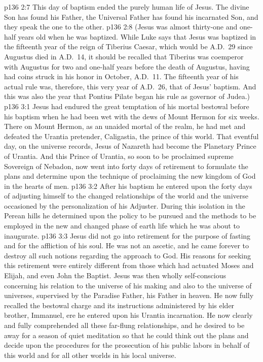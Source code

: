 \vs p136 2:7 This day of baptism ended the purely human life of Jesus. The divine Son has found his Father, the Universal Father has found his incarnated Son, and they speak the one to the other.
\pc \vs p136 2:8 (Jesus was almost thirty\hyp{}one and one\hyp{}half years old when he was baptized. While Luke says that Jesus was baptized in the fifteenth year of the reign of Tiberius Caesar, which would be A.D.~29 since Augustus died in A.D.~14, it should be recalled that Tiberius was coemperor with Augustus for two and one\hyp{}half years before the death of Augustus, having had coins struck in his honor in October, A.D.~11. The fifteenth year of his actual rule was, therefore, this very year of A.D.~26, that of Jesus’ baptism. And this was also the year that Pontius Pilate began his rule as governor of Judea.)
\vs p136 3:1 Jesus had endured the great temptation of his mortal bestowal before his baptism when he had been wet with the dews of Mount Hermon for six weeks. There on Mount Hermon, as an unaided mortal of the realm, he had met and defeated the Urantia pretender, Caligastia, the prince of this world. That eventful day, on the universe records, Jesus of Nazareth had become the Planetary Prince of Urantia. And this Prince of Urantia, so soon to be proclaimed supreme Sovereign of Nebadon, now went into forty days of retirement to formulate the plans and determine upon the technique of proclaiming the new kingdom of God in the hearts of men.
\vs p136 3:2 After his baptism he entered upon the forty days of adjusting himself to the changed relationships of the world and the universe occasioned by the personalization of his Adjuster. During this isolation in the Perean hills he determined upon the policy to be pursued and the methods to be employed in the new and changed phase of earth life which he was about to inaugurate.
\vs p136 3:3 Jesus did not go into retirement for the purpose of fasting and for the affliction of his soul. He was not an ascetic, and he came forever to destroy all such notions regarding the approach to God. His reasons for seeking this retirement were entirely different from those which had actuated Moses and Elijah, and even John the Baptist. Jesus was then wholly self\hyp{}conscious concerning his relation to the universe of his making and also to the universe of universes, supervised by the Paradise Father, his Father in heaven. He now fully recalled the bestowal charge and its instructions administered by his elder brother, Immanuel, ere he entered upon his Urantia incarnation. He now clearly and fully comprehended all these far\hyp{}flung relationships, and he desired to be away for a season of quiet meditation so that he could think out the plans and decide upon the procedures for the prosecution of his public labors in behalf of this world and for all other worlds in his local universe.
